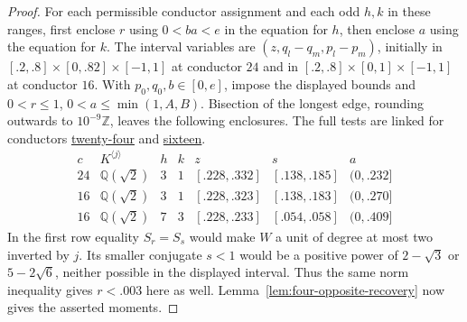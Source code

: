 \documentclass[11pt,reqno]{amsart}
\newcommand{\codecheck}[2]{\href{https://github.com/sebastienpalcoux/grothendieck-ring-classification/blob/d5750105bb5758f3ad38d2e5464dfcc12c019816/supplements/rank6/sphericality/#1}{#2}}
\theoremstyle{remark}\newtheorem{remark}[theorem]{Remark}
\numberwithin{equation}{section}
\begin{document}
\begin{proof}
For each permissible conductor assignment and each odd $h,k$ in
these ranges, first enclose $r$ using $0<ba<e$ in the equation for
$h$, then enclose $a$ using the equation for $k$. The interval variables are
$(z,q_l-q_m,p_l-p_m)$, initially in
$[.2,.8]\times[0,.82]\times[-1,1]$ at conductor $24$ and in
$[.2,.8]\times[0,1]\times[-1,1]$ at conductor $16$.
With $p_0,q_0,b\in[0,e]$, impose the displayed bounds and
$0<r\le1$, $0<a\le\min(1,A,B)$. Bisection of the longest edge,
rounding outwards to $10^{-9}\mathbb Z$, leaves the following
enclosures. The full tests are linked for conductors
\codecheck{field_checks/moments/moments24.py}{twenty-four} and
\codecheck{field_checks/moments/moments16.py}{sixteen}.
\[
\begin{array}{c|c|cc|ccc}
 c&K^{\langle j\rangle}&h&k&z&s&a\\\hline
 24&\mathbb Q(\sqrt2)&3&1&[.228,.332]&[.138,.185]&(0,.232]\\
 16&\mathbb Q(\sqrt2)&3&1&[.228,.323]&[.138,.183]&(0,.270]\\
 16&\mathbb Q(\sqrt2)&7&3&[.228,.233]&[.054,.058]&(0,.409]
\end{array}
\]
In the first row equality $S_r=S_s$ would make $W$ a unit of degree
at most two inverted by $j$. Its smaller conjugate $s<1$ would be a
positive power of $2-\sqrt3$ or $5-2\sqrt6$, neither possible in
the displayed interval. Thus the same norm inequality gives $r<.003$
here as well. Lemma~\ref{lem:four-opposite-recovery} now gives the
asserted moments.
\end{proof}
\end{document}
